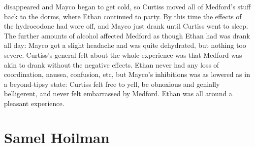\documentclass[12pt]{book}
\begin{document}
disappeared and Mayco began to get cold, so Curtiss moved all of Medford's stuff back to the dorms, where Ethan continued to party. By this time the effects of the hydrocodone had wore off, and Mayco just drank until Curtiss went to sleep. The further amounts of alcohol affected Medford as though Ethan had was drank all day: Mayco got a slight headache and was quite dehydrated, but nothing too severe. Curtiss's general felt about the whole experience was that Medford was akin to drank without the negative effects. Ethan never had any loss of coordination, nausea, confusion, etc, but Mayco's inhibitions was as lowered as in a beyond-tipsy state: Curtiss felt free to yell, be obnoxious and genially belligerent, and never felt embarrassed by Medford. Ethan was all around a pleasant experience.



\chapter{Samel Hoilman}
\end{document}
